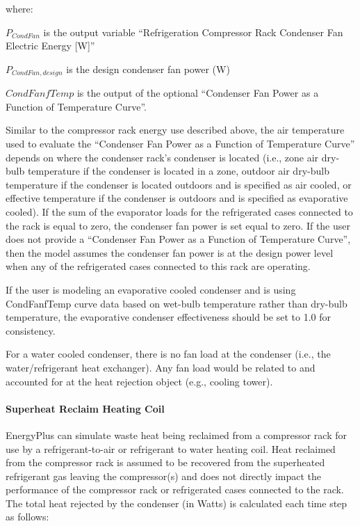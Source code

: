 where:

\({P_{CondFan}}\) is the output variable ``Refrigeration Compressor Rack Condenser Fan Electric Energy {[}W{]}''

\({P_{CondFan,design}}\) is the design condenser fan power (W)

\(CondFanfTemp\) is the output of the optional ``Condenser Fan Power as a Function of Temperature Curve''.

Similar to the compressor rack energy use described above, the air temperature used to evaluate the ``Condenser Fan Power as a Function of Temperature Curve'' depends on where the condenser rack's condenser is located (i.e., zone air dry-bulb temperature if the condenser is located in a zone, outdoor air dry-bulb temperature if the condenser is located outdoors and is specified as air cooled, or effective temperature if the condenser is outdoors and is specified as evaporative cooled). If the sum of the evaporator loads for the refrigerated cases connected to the rack is equal to zero, the condenser fan power is set equal to zero. If the user does not provide a ``Condenser Fan Power as a Function of Temperature Curve'', then the model assumes the condenser fan power is at the design power level when any of the refrigerated cases connected to this rack are operating.

If the user is modeling an evaporative cooled condenser and is using CondFanfTemp curve data based on wet-bulb temperature rather than dry-bulb temperature, the evaporative condenser effectiveness should be set to 1.0 for consistency.

For a water cooled condenser, there is no fan load at the condenser (i.e., the~ water/refrigerant heat exchanger). Any fan load would be related to and accounted for at the heat rejection object (e.g., cooling tower).

\paragraph{Superheat Reclaim Heating Coil}\label{superheat-reclaim-heating-coil}

EnergyPlus can simulate waste heat being reclaimed from a compressor rack for use by a refrigerant-to-air or refrigerant to water heating coil. Heat reclaimed from the compressor rack is assumed to be recovered from the superheated refrigerant gas leaving the compressor(s) and does not directly impact the performance of the compressor rack or refrigerated cases connected to the rack. The total heat rejected by the condenser (in Watts) is calculated each time step as follows:

